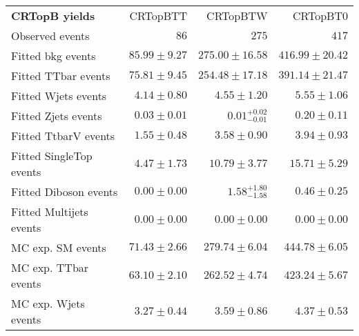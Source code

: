 

\begin{table}
\begin{center}
\setlength{\tabcolsep}{0.0pc}
{\small
\begin{tabular*}{\textwidth}{@{\extracolsep{\fill}}lrrr}
\noalign{\smallskip}\hline\noalign{\smallskip}
{\bf CRTopB yields}           & CRTopBTT            & CRTopBTW            & CRTopBT0              \\[-0.05cm]
\noalign{\smallskip}\hline\noalign{\smallskip}
Observed events          & $86$              & $275$              & $417$                    \\
\noalign{\smallskip}\hline\noalign{\smallskip}
Fitted bkg events         & $85.99 \pm 9.27$          & $275.00 \pm 16.58$          & $416.99 \pm 20.42$              \\
\noalign{\smallskip}\hline\noalign{\smallskip}
        Fitted TTbar events         & $75.81 \pm 9.45$          & $254.48 \pm 17.18$          & $391.14 \pm 21.47$              \\
        Fitted Wjets events         & $4.14 \pm 0.80$          & $4.55 \pm 1.20$          & $5.55 \pm 1.06$              \\
        Fitted Zjets events         & $0.03 \pm 0.01$          & $0.01_{-0.01}^{+0.02}$          & $0.20 \pm 0.11$              \\
        Fitted TtbarV events         & $1.55 \pm 0.48$          & $3.58 \pm 0.90$          & $3.94 \pm 0.93$              \\
        Fitted SingleTop events         & $4.47 \pm 1.73$          & $10.79 \pm 3.77$          & $15.71 \pm 5.29$              \\
        Fitted Diboson events         & $0.00 \pm 0.00$          & $1.58_{-1.58}^{+1.80}$          & $0.46 \pm 0.25$              \\
        Fitted Multijets events         & $0.00 \pm 0.00$          & $0.00 \pm 0.00$          & $0.00 \pm 0.00$              \\
 \noalign{\smallskip}\hline\noalign{\smallskip}
MC exp. SM events              & $71.43 \pm 2.66$          & $279.74 \pm 6.04$          & $444.78 \pm 6.05$              \\
\noalign{\smallskip}\hline\noalign{\smallskip}
        MC exp. TTbar events         & $63.10 \pm 2.10$          & $262.52 \pm 4.74$          & $423.24 \pm 5.67$              \\
        MC exp. Wjets events         & $3.27 \pm 0.44$          & $3.59 \pm 0.86$          & $4.37 \pm 0.53$              \\

\end{tabular*}}
\end{center}
\end{table}
